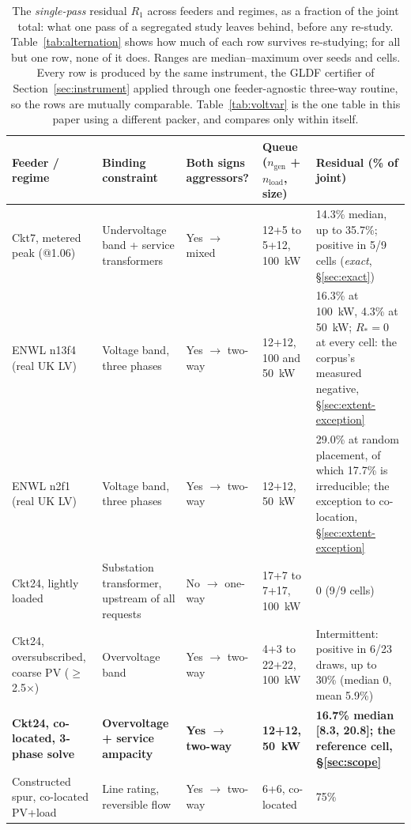 \documentclass[review,authoryear,12pt]{elsarticle}
\begin{document}
\begin{table}[htbp]
\centering
\caption{The \emph{single-pass} residual $R_{1}$ across feeders and regimes, as
a fraction of the joint total: what one pass of a segregated study leaves
behind, before any re-study. Table~\ref{tab:alternation} shows how much of each
row survives re-studying; for all but one row, none of it does.
Ranges are median--maximum over seeds and cells. Every row is produced
by the same instrument, the GLDF certifier of Section~\ref{sec:instrument}
applied through one feeder-agnostic three-way routine, so the rows are
mutually comparable. Table~\ref{tab:voltvar} is the one table in this paper
using a different packer, and compares only within itself.}
\label{tab:headline}
\scriptsize
\begin{tabular}{@{}p{2.9cm}p{2.6cm}p{1.9cm}p{1.5cm}p{3.1cm}@{}}
\toprule
Feeder / regime & Binding constraint & Both signs aggressors? & Queue ($n_{\text{gen}}$ + $n_{\text{load}}$, size) & Residual (\% of joint) \\
\midrule
Ckt7, metered peak (@1.06) & Undervoltage band + service transformers & Yes $\to$ mixed & 12+5 to 5+12, 100~kW & 14.3\% median, up to 35.7\%; positive in 5/9 cells (\emph{exact}, \S\ref{sec:exact}) \\
ENWL n13f4 (real UK LV) & Voltage band, three phases & Yes $\to$ two-way & 12+12, 100 and 50~kW & 16.3\% at 100~kW, 4.3\% at 50~kW; $R_{\ast}=0$ at every cell: the corpus's measured negative, \S\ref{sec:extent-exception} \\
ENWL n2f1 (real UK LV) & Voltage band, three phases & Yes $\to$ two-way & 12+12, 50~kW & 29.0\% at random placement, of which 17.7\% is irreducible; the exception to co-location, \S\ref{sec:extent-exception} \\
Ckt24, lightly loaded & Substation transformer, upstream of all requests & No $\to$ one-way & 17+7 to 7+17, 100~kW & 0 (9/9 cells) \\
Ckt24, oversubscribed, coarse PV ($\ge$2.5$\times$) & Overvoltage band & Yes $\to$ two-way & 4+3 to 22+22, 100~kW & Intermittent: positive in 6/23 draws, up to 30\% (median 0, mean 5.9\%) \\
\textbf{Ckt24, co-located, 3-phase solve} & \textbf{Overvoltage + service ampacity} & \textbf{Yes $\to$ two-way} & \textbf{12+12, 50~kW} & \textbf{16.7\% median [8.3, 20.8]; the reference cell, \S\ref{sec:scope}} \\
Constructed spur, co-located PV+load & Line rating, reversible flow & Yes $\to$ two-way & 6+6, co-located & 75\% \\

\end{tabular}
\end{table}
\end{document}
